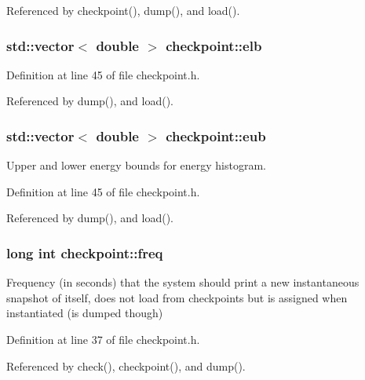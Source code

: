 Referenced by checkpoint(), dump(), and load().

\hypertarget{classcheckpoint_a2338cb624f19eb6776c10f9bb83b2a5d}{
\subsubsection[{elb}]{\setlength{\rightskip}{0pt plus 5cm}std\-::vector$<$ double $>$ checkpoint\-::elb}}\label{classcheckpoint_a2338cb624f19eb6776c10f9bb83b2a5d}


Definition at line 45 of file checkpoint.\-h.



Referenced by dump(), and load().

\hypertarget{classcheckpoint_a7071b01d0936873321d0a706e761b6ac}{
\subsubsection[{eub}]{\setlength{\rightskip}{0pt plus 5cm}std\-::vector$<$ double $>$ checkpoint\-::eub}}\label{classcheckpoint_a7071b01d0936873321d0a706e761b6ac}


Upper and lower energy bounds for energy histogram. 



Definition at line 45 of file checkpoint.\-h.



Referenced by dump(), and load().

\hypertarget{classcheckpoint_a11a2d78eb0bf6045b659a4d18b53da44}{
\subsubsection[{freq}]{\setlength{\rightskip}{0pt plus 5cm}long int checkpoint\-::freq}}\label{classcheckpoint_a11a2d78eb0bf6045b659a4d18b53da44}


Frequency (in seconds) that the system should print a new instantaneous snapshot of itself, does not load from checkpoints but is assigned when instantiated (is dumped though) 



Definition at line 37 of file checkpoint.\-h.



Referenced by check(), checkpoint(), and dump().


